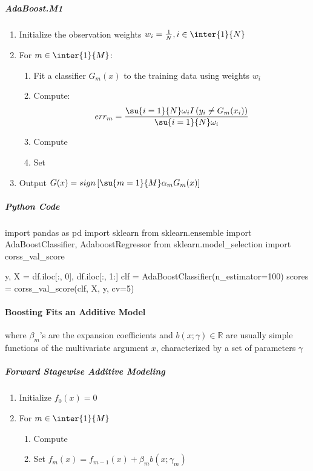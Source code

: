 \subparagraph{AdaBoost.M1}
\begin{enumerate}
	\item Initialize the observation weights $w_{i}=\frac{1}{N}, i\in\inter{1}{N}$
	\item For $m\in\inter{1}{M}$:
		\begin{enumerate}[label=\alph*]
			\item Fit a classifier $G_{m}(x)$ to the training data using weights $w_{i}$
			\item Compute:
				$$ err_{m} = \dfrac{\su{{i=1}}{N}\omega_{i}I\left(y_{i}\neq G_{m}(x_{i})\right)}{\su{{i=1}}{N}\omega_{i}}$$
			\item Compute 
			\item Set 
		\end{enumerate}
	\item Output $G(x)=sign\left[\su{{m=1}}{M}\alpha_{m}G_{m}(x)\right]$
\end{enumerate}
\subparagraph{Python Code}
\begin{python}
import pandas as pd
import sklearn
from sklearn.ensemble import AdaBoostClassifier,
    AdaboostRegressor
from sklearn.model_selection import corss_val_score

y, X = df.iloc[:, 0], df.iloc[:, 1:]
clf = AdaBoostClassifier(n_estimator=100)
scores = corss_val_score(clf, X, y, cv=5)
\end{python}

\paragraph{Boosting Fits an Additive Model}
\begin{center}
\end{center}
where $\beta_{m}$'s are the expansion coefficients and $b(x;\gamma)\in\mathbb{R}$ are usually
simple functions of the multivariate argument $x$, characterized by a set of parameters $\gamma$
\subparagraph{Forward Stagewise Additive Modeling}
\begin{enumerate}
	\item Initialize $f_{0}(x)=0$
	\item For $m\in\inter{1}{M}$
		\begin{enumerate}[label=\alph*]
			\item Compute 
			\item Set $f_{m}(x)=f_{m-1}(x)+\beta_{m}b(x;\gamma_{m})$
		\end{enumerate}
\end{enumerate}

